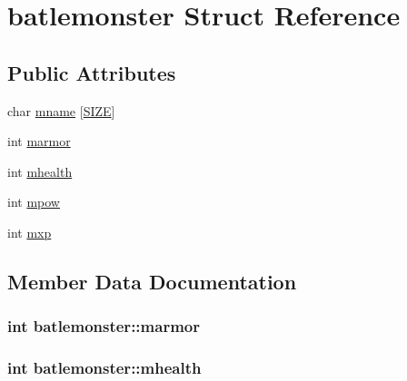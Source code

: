 \hypertarget{structbatlemonster}{}\section{batlemonster Struct Reference}
\label{structbatlemonster}
\subsection*{Public Attributes}
\begin{DoxyCompactItemize}
\item 
char \hyperlink{structbatlemonster_a6c57d5d01f9158a2a9ccefc8b415e9c0}{mname} \mbox{[}\hyperlink{main_8cpp_af08413a3ee12cf78b0ddeea71e2648b3}{S\+I\+Z\+E}\mbox{]}
\item 
int \hyperlink{structbatlemonster_a98725fc12c175368856ab0d1b0bf2029}{marmor}
\item 
int \hyperlink{structbatlemonster_af746aa9f037bc052ca302752a4a09546}{mhealth}
\item 
int \hyperlink{structbatlemonster_ad31fa7808b66b010420cd5f1a8e3a5a5}{mpow}
\item 
int \hyperlink{structbatlemonster_a1bb930b1c95ac77044b9ce1cfa456bf6}{mxp}
\end{DoxyCompactItemize}


\subsection{Member Data Documentation}
\hypertarget{structbatlemonster_a98725fc12c175368856ab0d1b0bf2029}{}
\subsubsection[{marmor}]{\setlength{\rightskip}{0pt plus 5cm}int batlemonster\+::marmor}\label{structbatlemonster_a98725fc12c175368856ab0d1b0bf2029}
\hypertarget{structbatlemonster_af746aa9f037bc052ca302752a4a09546}{}
\subsubsection[{mhealth}]{\setlength{\rightskip}{0pt plus 5cm}int batlemonster\+::mhealth}\label{structbatlemonster_af746aa9f037bc052ca302752a4a09546}
\hypertarget{structbatlemonster_a6c57d5d01f9158a2a9ccefc8b415e9c0}{}
